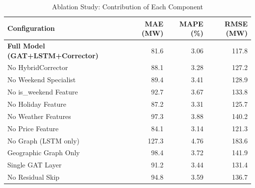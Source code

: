\begin{table}[h]
\centering
\caption{Ablation Study: Contribution of Each Component}
\label{tab:ablation}
\begin{tabular}{@{}lrrr@{}}\toprule
Configuration & MAE (MW) & MAPE (\%) & RMSE (MW) \\ \midrule
\textbf{Full Model (GAT+LSTM+Corrector)} & 81.6 & 3.06 & 117.8 \\
No HybridCorrector & 88.1 & 3.28 & 127.2 \\
No Weekend Specialist & 89.4 & 3.41 & 128.9 \\
No is_weekend Feature & 92.7 & 3.67 & 133.8 \\
No Holiday Feature & 87.2 & 3.31 & 125.7 \\
No Weather Features & 97.3 & 3.88 & 140.2 \\
No Price Feature & 84.1 & 3.14 & 121.3 \\
No Graph (LSTM only) & 127.3 & 4.76 & 183.6 \\
Geographic Graph Only & 98.4 & 3.72 & 141.9 \\
Single GAT Layer & 91.2 & 3.44 & 131.4 \\
No Residual Skip & 94.8 & 3.59 & 136.7 \\
\bottomrule
\end{tabular}
\end{table}
